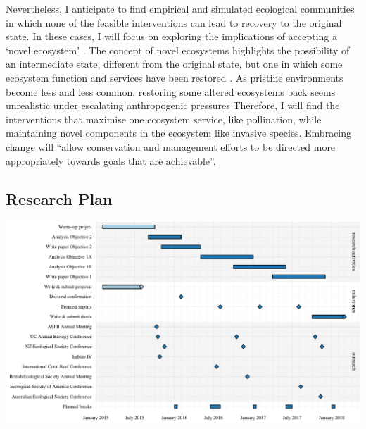 \documentclass[a4paper]{article}
\begin{document}
Nevertheless, I anticipate to find empirical and simulated ecological communities in which none of the feasible interventions can lead to recovery to the original state.
In these cases, I will focus on exploring the implications of accepting a `novel ecosystem' \autocite{Hobbs2006}.
The concept of novel ecosystems highlights the possibility of an intermediate state, different from the original state, but one in which some ecosystem function and services have been restored \autocite{Graham2014a, Graham2015a}.
As pristine environments become less and less common, restoring some altered ecosystems back seems unrealistic under escalating anthropogenic pressures \autocite{Graham2015a}
Therefore, I will find the interventions that maximise one ecosystem service, like pollination, while maintaining novel components in the ecosystem like invasive species.
Embracing change will ``allow conservation and management efforts to be directed more appropriately towards goals that are achievable''\autocite{Graham2014a}.

\begin{landscape}
\section{Research Plan}
\includegraphics{schedule}
\end{landscape}

\printbibliography
\end{document}

